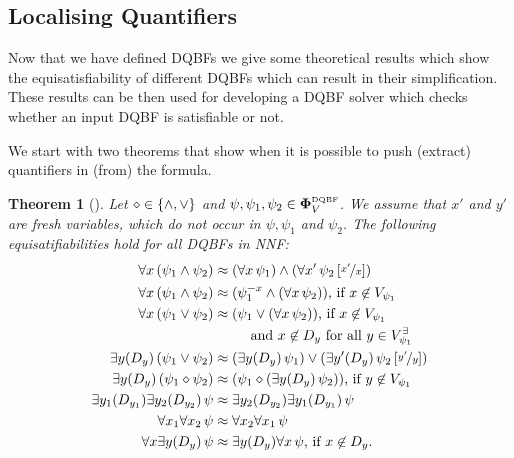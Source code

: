 \documentclass[
  digital, %
  twoside, %
  table,   %
  nolof,     %
  nolot,     %
]{fithesis3}
\let\setbuilder\set
\newcommand{\simpleset}[1]{\{{#1}\}}
\renewcommand{\set}[1]{\normalexpandarg\IfSubStr{#1}{|}{\setbuilder{#1}}{\simpleset{#1}}}
\newtheorem{theorem}{Theorem}[chapter] %
\theoremstyle{definition}
\theoremstyle{remark}
\newcommand{\substitute}[2]{\left[ \nicefrac{#2}{#1} \right]}
\newcommand{\DQBF}[1]{\mathbf{\Phi}_{#1}^{\normalfont{\text{\tiny DQBF}}}}
\newcommand{\evars}[1]{V_{#1}^{\exists}}
\newcommand{\itholds}{\,}
\begin{document}
\subsection{Localising Quantifiers}
\label{sec:quantLocalization}
Now that we have defined DQBFs we give some theoretical results which show the equisatisfiability of different DQBFs which can result in their simplification. These results can be then used for developing a DQBF solver which checks whether an input DQBF is satisfiable or not.

We start with two theorems that show when it is possible to push (extract) quantifiers in (from) the formula. %

\begin{theorem}[{\cite[Theorems 3,4]{HQSquantifierLocalization}}]
\label{thrm:quantLocalEq}
  Let ${\diamond} \in \set{{\land},{\lor}}$ and $\psi,\psi_1,\psi_2 \in \DQBF{V}$. We assume that $x'$ and $y'$ are fresh variables, which do not occur in $\psi,\psi_1$ and $\psi_2$. The following equisatifiabilities hold for all DQBFs in NNF:
  \begin{align}
      \forall x \itholds (\psi_1 \land \psi_2) &\approx (\forall x \itholds \psi_1) \land (\forall x' \itholds \psi_2\substitute{x}{x'}) \\
      \forall x \itholds (\psi_1 \land \psi_2) &\approx (\psi_1^{-x} \land (\forall x \itholds \psi_2)) \text{, if } x \not\in V_{\psi_1} \\
      \forall x \itholds (\psi_1 \lor \psi_2) &\approx \begin{multlined}[t][3cm](\psi_1 \lor (\forall x \itholds \psi_2)) \text{, if } x \not\in V_{\psi_1}\\
      \text{ and } x \not\in D_y \text{ for all } y \in \evars{\psi_1}\end{multlined} \\
      \exists y(D_y) \itholds (\psi_1 \lor \psi_2) &\approx (\exists y(D_y) \itholds \psi_1) \lor (\exists y'(D_y) \itholds \psi_2\substitute{y}{y'}) \\
      \exists y(D_y) \itholds (\psi_1 \diamond \psi_2) &\approx (\psi_1 \diamond (\exists y(D_y) \itholds \psi_2)) \text{, if } y \not\in V_{\psi_1} \\
      \exists y_1(D_{y_1})\exists y_2(D_{y_2}) \itholds \psi &\approx \exists y_2(D_{y_2}) \exists y_1(D_{y_1}) \itholds \psi \\
      \forall x_1\forall x_2 \itholds \psi &\approx \forall x_2\forall x_1 \itholds \psi \\
      \forall x\exists y(D_y) \itholds \psi &\approx \exists y(D_y)\forall x \itholds \psi\text{, if } x \not\in D_y.
  \end{align}
\end{theorem}
\end{document}
